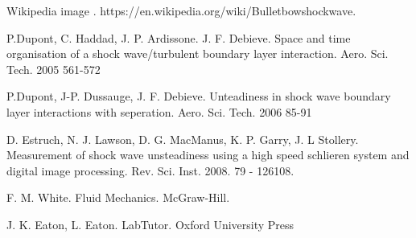 \documentclass[a4paper,10pt,twoside]{article}
\begin{document}
\begin{multicols}{2}
\begin{thebibliography}{9}
 Wikipedia image . https://en.wikipedia.org/wiki/Bulletbowshockwave.



 P.Dupont, C. Haddad, J. P. Ardissone. J. F. Debieve. Space and time organisation of a shock wave/turbulent boundary layer interaction. Aero. Sci. Tech. 2005 561-572



 P.Dupont, J-P. Dussauge, J. F. Debieve. Unteadiness in shock wave boundary layer interactions with seperation. Aero. Sci. Tech. 2006 85-91



 D. Estruch, N. J. Lawson, D. G. MacManus, K. P. Garry, J. L Stollery. Measurement of shock wave unsteadiness using a high speed schlieren system and digital image processing. Rev. Sci. Inst. 2008. 79 - 126108.



 F. M. White. Fluid Mechanics. McGraw-Hill.



 J. K. Eaton, L. Eaton. LabTutor. Oxford University Press





\end{thebibliography}





\end{multicols}
\end{document}
